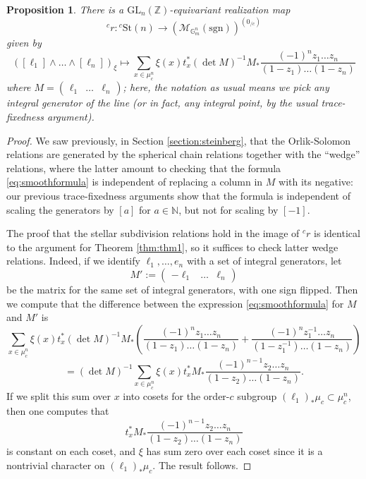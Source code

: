 \documentclass[10pt]{amsart}
\newtheorem{prop}[thm]{Proposition}
\theoremstyle{definition}
\newcommand{\Z}{\mathbb{Z}}
\newcommand{\sgn}{\mathrm{sgn}}
\newcommand{\St}{\mathrm{St}}
\newcommand{\G}{\mathbb{G}}
\newcommand{\GL}{\mathrm{GL}}
\numberwithin{equation}{section}
\begin{document}
    \begin{prop}
    There is a $\GL_n(\Z)$-equivariant realization map
    \[
    {}^cr: {}^c\St(n) \to (\mathcal{M}_{\G_m^n}(\sgn))^{(0_{/c})}
    \]
    given by 
    \begin{equation} \label{eq:smoothformula}
    ([\ell_1]\wedge \ldots \wedge [\ell_n])_\xi \mapsto \sum_{x\in \mu_c^n} \xi(x)t_x^* (\det M)^{-1} M_* \frac{(-1)^nz_1\ldots z_n}{(1-z_1)\ldots (1-z_n)}
    \end{equation}
    where $M=\begin{pmatrix}\ell_1&\ldots &\ell_n\end{pmatrix}$; here, the notation as usual means we pick any integral generator of the line (or in fact, any integral point, by the usual trace-fixedness argument).
    \end{prop}
    \begin{proof}
        We saw previously, in Section \ref{section:steinberg}, that the Orlik-Solomon relations are generated by the spherical chain relations together with the ``wedge'' relations, where the latter amount to checking that the formula \eqref{eq:smoothformula} is independent of replacing a column in $M$ with its negative: our previous trace-fixedness arguments show that the formula is independent of scaling the generators by $[a]$ for $a\in \mathbb{N}$, but not for scaling by $[-1]$.
        
        The proof that the stellar subdivision relations hold in the image of ${}^cr$ is identical to the argument for Theorem \ref{thm:thm1}, so it suffices to check latter wedge relations. Indeed, if we identify $\ell_1,\ldots, e_n$ with a set of integral generators, let
        \[
        M' := \begin{pmatrix}-\ell_1&\ldots &\ell_n\end{pmatrix}
        \]
        be the matrix for the same set of integral generators, with one sign flipped. Then we compute that the difference between the expression \eqref{eq:smoothformula} for $M$ and $M'$ is 
        \[
            \sum_{x\in \mu_c^n} \xi(x)t_x^* (\det M)^{-1} M_* \left(\frac{(-1)^nz_1\ldots z_n}{(1-z_1)\ldots (1-z_n)} + \frac{(-1)^nz_1^{-1}\ldots z_n}{(1-z_1^{-1})\ldots (1-z_n)} \right)
            \]
        \[ 
        = (\det M)^{-1} \sum_{x\in \mu_c^n} \xi(x)t_x^*  M_* \frac{(-1)^{n-1}z_2\ldots z_n}{(1-z_2)\ldots (1-z_n)}.
        \]
        If we split this sum over $x$ into cosets for the order-$c$ subgroup $(\ell_1)_* \mu_c\subset \mu_c^n$, then one computes that
        \[
            t_x^* M_* \frac{(-1)^{n-1}z_2\ldots z_n}{(1-z_2)\ldots (1-z_n)}
        \]
        is constant on each coset, and $\xi$ has sum zero over each coset since it is a nontrivial character on $(\ell_1)_* \mu_c$. The result follows.
    \end{proof}
\end{document}

